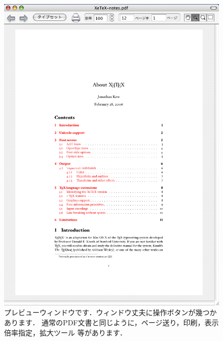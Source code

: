 \begin{figure}[htbp]
 \begin{center}
 \includegraphics[scale=.4]{images/TeXShop03} 
 \caption[\TeX Shop のプレビューウィンドウ]{
  プレビューウィンドウです．ウィンドウ丈夫に操作ボタンが幾つかあります．
  通常のPDF文書と同じように，ページ送り，印刷，表示倍率指定，拡大ツール
  等があります．}
 \end{center}
\end{figure}

